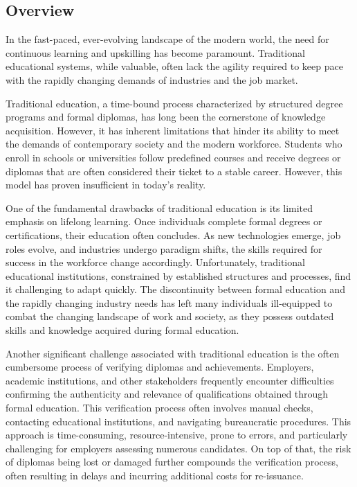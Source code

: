 \documentclass{article}
\begin{document}
\begin{multicols}{2}

    \section{Overview}

    In the fast-paced, ever-evolving landscape of the modern world, the need for continuous learning and upskilling has become paramount. Traditional educational systems, while valuable, often lack the agility required to keep pace with the rapidly changing demands of industries and the job market.

    Traditional education, a time-bound process characterized by structured degree programs and formal diplomas, has long been the cornerstone of knowledge acquisition. However, it has inherent limitations that hinder its ability to meet the demands of contemporary society and the modern workforce. Students who enroll in schools or universities follow predefined courses and receive degrees or diplomas that are often considered their ticket to a stable career. However, this model has proven insufficient in today's reality.

    One of the fundamental drawbacks of traditional education is its limited emphasis on lifelong learning. Once individuals complete formal degrees or certifications, their education often concludes. As new technologies emerge, job roles evolve, and industries undergo paradigm shifts, the skills required for success in the workforce change accordingly. Unfortunately, traditional educational institutions, constrained by established structures and processes, find it challenging to adapt quickly. The discontinuity between formal education and the rapidly changing industry needs has left many individuals ill-equipped to combat the changing landscape of work and society, as they possess outdated skills and knowledge acquired during formal education.

    Another significant challenge associated with traditional education is the often cumbersome process of verifying diplomas and achievements. Employers, academic institutions, and other stakeholders frequently encounter difficulties confirming the authenticity and relevance of qualifications obtained through formal education. This verification process often involves manual checks, contacting educational institutions, and navigating bureaucratic procedures. This approach is time-consuming, resource-intensive, prone to errors, and particularly challenging for employers assessing numerous candidates. On top of that, the risk of diplomas being lost or damaged further compounds the verification process, often resulting in delays and incurring additional costs for re-issuance.


\end{multicols}
\end{document}

